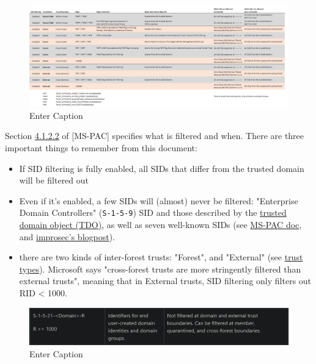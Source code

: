 \begin{figure}
    \centering
    \includegraphics[width=0.75\linewidth]{sidfiltering.png}
    \caption{Enter Caption}
    \label{fig:placeholder}
\end{figure}

Section \href{https://docs.microsoft.com/en-us/openspecs/windows_protocols/ms-pac/55fc19f2-55ba-4251-8a6a-103dd7c66280}{4.1.2.2} of [MS-PAC] specifies what is filtered and when. There are three important things to remember from this document:

\begin{itemize}
    \item If SID filtering is fully enabled, all SIDs that differ from the trusted domain will be filtered out
    \item Even if it's enabled, a few SIDs will (almost) never be filtered: "Enterprise Domain Controllers" (\texttt{S-1-5-9}) SID and those described by the \href{https://learn.microsoft.com/en-us/openspecs/windows_protocols/ms-pac/f2ef15b6-1e9b-48b5-bf0b-019f061d41c8\#gt_f2ceef4e-999b-4276-84cd-2e2829de5fc4}{trusted domain object (TDO)}, as well as seven well-known SIDs (see \href{https://learn.microsoft.com/en-us/openspecs/windows_protocols/ms-pac/55fc19f2-55ba-4251-8a6a-103dd7c66280}{MS-PAC doc}, and \href{https://improsec.com/tech-blog/sid-filter-as-security-boundary-between-domains-part-3-sid-filtering-explained\#yui_3_17_2_1_1673614140169_543}{improsec's blogpost}).
    \item there are two kinds of inter-forest trusts: "Forest", and "External" (see \href{https://www.thehacker.recipes/ad/movement/trusts/index\#trust-types}{trust types}). Microsoft says "cross-forest trusts are more stringently filtered than external trusts", meaning that in External trusts, SID filtering only filters out RID < 1000.
\end{itemize}

\begin{figure}
    \centering
    \includegraphics[width=0.75\linewidth]{ms-pacsection.png}
    \caption{Enter Caption}
    \label{fig:placeholder}
\end{figure}

